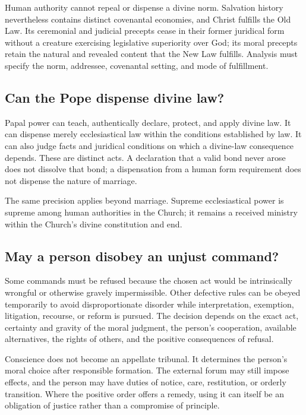 Human authority cannot repeal or dispense a divine norm. Salvation history nevertheless contains distinct covenantal economies, and Christ fulfills the Old Law. Its ceremonial and judicial precepts cease in their former juridical form without a creature exercising legislative superiority over God; its moral precepts retain the natural and revealed content that the New Law fulfills. Analysis must specify the norm, addressee, covenantal setting, and mode of fulfillment.

\subsection{Can the Pope dispense divine law?}

Papal power can teach, authentically declare, protect, and apply divine law. It can dispense merely ecclesiastical law within the conditions established by law. It can also judge facts and juridical conditions on which a divine-law consequence depends. These are distinct acts. A declaration that a valid bond never arose does not dissolve that bond; a dispensation from a human form requirement does not dispense the nature of marriage.

The same precision applies beyond marriage. Supreme ecclesiastical power is supreme among human authorities in the Church; it remains a received ministry within the Church's divine constitution and end.

\subsection{May a person disobey an unjust command?}

Some commands must be refused because the chosen act would be intrinsically wrongful or otherwise gravely impermissible. Other defective rules can be obeyed temporarily to avoid disproportionate disorder while interpretation, exemption, litigation, recourse, or reform is pursued. The decision depends on the exact act, certainty and gravity of the moral judgment, the person's cooperation, available alternatives, the rights of others, and the positive consequences of refusal.

Conscience does not become an appellate tribunal. It determines the person's moral choice after responsible formation. The external forum may still impose effects, and the person may have duties of notice, care, restitution, or orderly transition. Where the positive order offers a remedy, using it can itself be an obligation of justice rather than a compromise of principle.

